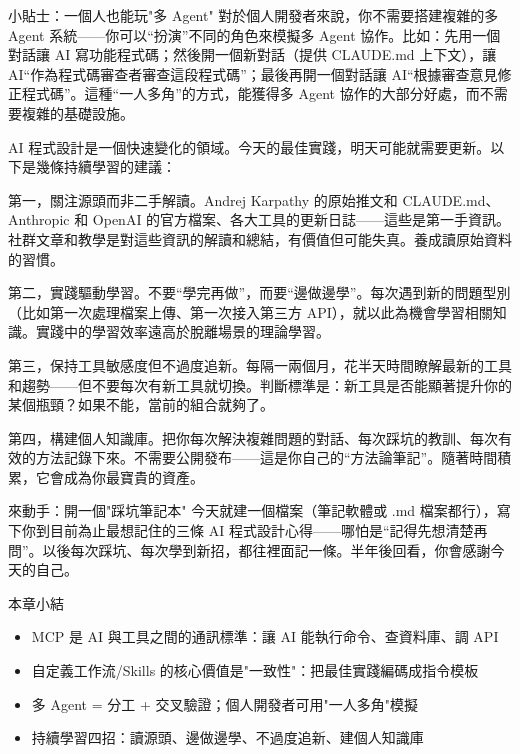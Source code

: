 \begin{tcbinfo}{小貼士：一個人也能玩"多 Agent"}
對於個人開發者來說，你不需要搭建複雜的多 Agent 系統——你可以“扮演”不同的角色來模擬多 Agent 協作。比如：先用一個對話讓 AI 寫功能程式碼；然後開一個新對話（提供 CLAUDE.md 上下文），讓 AI“作為程式碼審查者審查這段程式碼”；最後再開一個對話讓 AI“根據審查意見修正程式碼”。這種“一人多角”的方式，能獲得多 Agent 協作的大部分好處，而不需要複雜的基礎設施。

\end{tcbinfo}


AI 程式設計是一個快速變化的領域。今天的最佳實踐，明天可能就需要更新。以下是幾條持續學習的建議：

第一，關注源頭而非二手解讀。Andrej Karpathy 的原始推文和 CLAUDE.md、Anthropic 和 OpenAI 的官方檔案、各大工具的更新日誌——這些是第一手資訊。社群文章和教學是對這些資訊的解讀和總結，有價值但可能失真。養成讀原始資料的習慣。

第二，實踐驅動學習。不要“學完再做”，而要“邊做邊學”。每次遇到新的問題型別（比如第一次處理檔案上傳、第一次接入第三方 API），就以此為機會學習相關知識。實踐中的學習效率遠高於脫離場景的理論學習。

第三，保持工具敏感度但不過度追新。每隔一兩個月，花半天時間瞭解最新的工具和趨勢——但不要每次有新工具就切換。判斷標準是：新工具是否能顯著提升你的某個瓶頸？如果不能，當前的組合就夠了。

第四，構建個人知識庫。把你每次解決複雜問題的對話、每次踩坑的教訓、每次有效的方法記錄下來。不需要公開發布——這是你自己的“方法論筆記”。隨著時間積累，它會成為你最寶貴的資產。

\begin{tcbpractice}{來動手：開一個"踩坑筆記本"}
今天就建一個檔案（筆記軟體或 .md 檔案都行），寫下你到目前為止最想記住的三條 AI 程式設計心得——哪怕是“記得先想清楚再問”。以後每次踩坑、每次學到新招，都往裡面記一條。半年後回看，你會感謝今天的自己。

\end{tcbpractice}

\begin{tcbsummary}{本章小結}
\begin{itemize}
  \item MCP 是 AI 與工具之間的通訊標準：讓 AI 能執行命令、查資料庫、調 API
  \item 自定義工作流/Skills 的核心價值是"一致性"：把最佳實踐編碼成指令模板
  \item 多 Agent = 分工 + 交叉驗證；個人開發者可用"一人多角"模擬
  \item 持續學習四招：讀源頭、邊做邊學、不過度追新、建個人知識庫
\end{itemize}

\end{tcbsummary}
